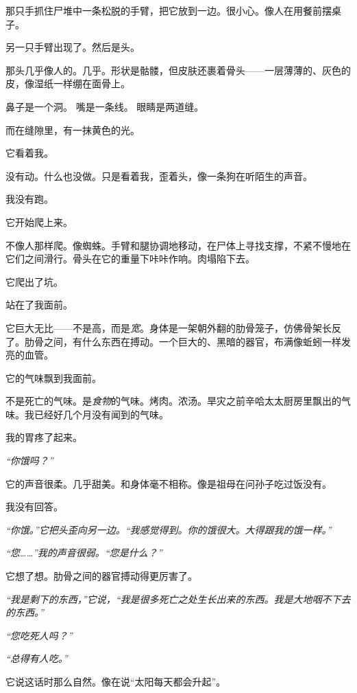 \noindent 那只手抓住尸堆中一条松脱的手臂，把它放到一边。很小心。像人在用餐前摆桌子。

\noindent 另一只手臂出现了。然后是头。

\noindent 那头几乎像人的。几乎。形状是骷髅，但皮肤还裹着骨头——一层薄薄的、灰色的皮，像湿纸一样绷在面骨上。

\noindent 鼻子是一个洞。
嘴是一条线。
眼睛是两道缝。

\noindent 而在缝隙里，有一抹黄色的光。

\noindent 它看着我。

\noindent 没有动。什么也没做。只是看着我，歪着头，像一条狗在听陌生的声音。

\noindent 我没有跑。

\noindent 它开始爬上来。

\noindent 不像人那样爬。像蜘蛛。手臂和腿协调地移动，在尸体上寻找支撑，不紧不慢地在它们之间滑行。骨头在它的重量下咔咔作响。肉塌陷下去。

\noindent 它爬出了坑。

\noindent 站在了我面前。

\noindent 它巨大无比——不是高，而是\textit{宽}。身体是一架朝外翻的肋骨笼子，仿佛骨架长反了。肋骨之间，有什么东西在搏动。一个巨大的、黑暗的器官，布满像蚯蚓一样发亮的血管。

\noindent 它的气味飘到我面前。

\noindent 不是死亡的气味。是\textit{食物}的气味。烤肉。浓汤。旱灾之前辛哈太太厨房里飘出的气味。我已经好几个月没有闻到的气味。

\noindent 我的胃疼了起来。

\noindent \textit{“你饿吗？”}

\noindent 它的声音很柔。几乎甜美。和身体毫不相称。像是祖母在问孙子吃过饭没有。

\noindent 我没有回答。

\noindent \textit{“你饿。”它把头歪向另一边。“我感觉得到。你的饿很大。大得跟我的饿一样。”}

\noindent \textit{“您……”我的声音很弱。“您是什么？”}

\noindent 它想了想。肋骨之间的器官搏动得更厉害了。

\noindent \textit{“我是剩下的东西，”它说，“我是很多死亡之处生长出来的东西。我是大地咽不下去的东西。”}

\noindent \textit{“您吃死人吗？”}

\noindent \textit{“总得有人吃。”}

\noindent 它说这话时那么自然。像在说“太阳每天都会升起”。

